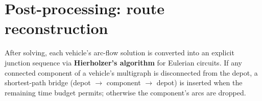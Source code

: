 \documentclass[11pt]{article}
\begin{document}
\section{Post-processing: route reconstruction}

After solving, each vehicle's arc-flow solution is converted into an
explicit junction sequence via \textbf{Hierholzer's algorithm} for Eulerian
circuits.  If any connected component of a vehicle's multigraph is
disconnected from the depot, a shortest-path bridge (depot $\to$ component
$\to$ depot) is inserted when the remaining time budget permits; otherwise
the component's arcs are dropped.
\end{document}
